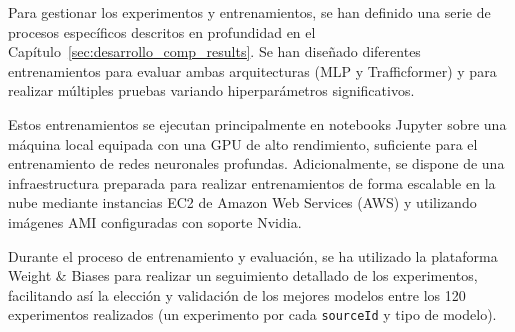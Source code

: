 Para gestionar los experimentos y entrenamientos, se han definido una serie de procesos específicos descritos en profundidad en el Capítulo~\ref{sec:desarrollo_comp_results}. Se han diseñado diferentes entrenamientos para evaluar ambas arquitecturas (MLP y Trafficformer) y para realizar múltiples pruebas variando hiperparámetros significativos.

Estos entrenamientos se ejecutan principalmente en notebooks Jupyter sobre una máquina local equipada con una GPU de alto rendimiento, suficiente para el entrenamiento de redes neuronales profundas. Adicionalmente, se dispone de una infraestructura preparada para realizar entrenamientos de forma escalable en la nube mediante instancias EC2 de Amazon Web Services (AWS) y utilizando imágenes AMI configuradas con soporte Nvidia.

Durante el proceso de entrenamiento y evaluación, se ha utilizado la plataforma Weight \& Biases para realizar un seguimiento detallado de los experimentos, facilitando así la elección y validación de los mejores modelos entre los 120 experimentos realizados (un experimento por cada \texttt{sourceId} y tipo de modelo).